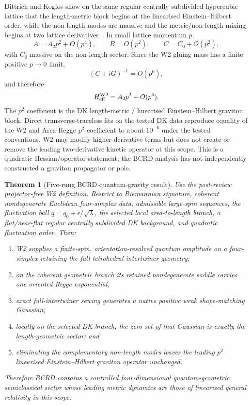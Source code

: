 \documentclass[11pt]{article}
\numberwithin{equation}{section}
\newtheorem{theorem}{Theorem}[section]
\newcommand{\Wtwo}{\mathrm{W2}}
\begin{document}
Dittrich and Kogios show on the same regular centrally subdivided hypercubic lattice that the length-metric block begins at the linearised Einstein--Hilbert order, while the non-length modes are massive and the metric/non-length mixing begins at two lattice derivatives~\cite{DittrichKogios2023}. In small lattice momentum $p$,
\begin{equation}
  A=A_2p^2+O(p^4),\qquad
  B=O(p^2),\qquad
  C=C_0+O(p^2),
\end{equation}
with $C_0$ massive on the non-length sector. Since the W2 gluing mass has a finite positive $p\to0$ limit,
\begin{equation}
  (C+iG)^{-1}=O(p^0),
\end{equation}
and therefore
\begin{equation}\label{eq:EH}
  H_{\rm eff}^{\Wtwo}=A_2p^2+O(p^4).
\end{equation}
The $p^2$ coefficient is the DK length-metric / linearised Einstein--Hilbert graviton block. Direct transverse-traceless fits on the tested DK data reproduce equality of the W2 and Area-Regge $p^2$ coefficient to about $10^{-6}$ under the tested conventions. W2 may modify higher-derivative terms but does not create or remove the leading two-derivative kinetic operator at this scope. This is a quadratic Hessian/operator statement; the BCRD analysis has not independently constructed a graviton propagator or pole.

\begin{theorem}[Five-rung BCRD quantum-gravity result]\label{thm:five}
Use the post-review projector-free W2 definition. Restrict to Riemannian signature, coherent nondegenerate Euclidean four-simplex data, admissible large-spin sequences, the fluctuation ball $q=q_0+\epsilon/\sqrt\lambda$, the selected local area-to-length branch, a flat/near-flat regular centrally subdivided DK background, and quadratic fluctuation order. Then:
\begin{enumerate}[label=(\roman*)]
\item W2 supplies a finite-spin, orientation-resolved quantum amplitude on a four-simplex retaining the full tetrahedral intertwiner geometry;
\item on the coherent geometric branch its retained nondegenerate saddle carries one oriented Regge exponential;
\item exact full-intertwiner sewing generates a native positive weak shape-matching Gaussian;
\item locally on the selected DK branch, the zero set of that Gaussian is exactly the length-geometric sector; and
\item eliminating the complementary non-length modes leaves the leading $p^2$ linearised Einstein--Hilbert graviton operator unchanged.
\end{enumerate}
Therefore BCRD contains a controlled four-dimensional quantum-geometric semiclassical sector whose leading metric dynamics are those of linearised general relativity in this scope.
\end{theorem}
\end{document}
